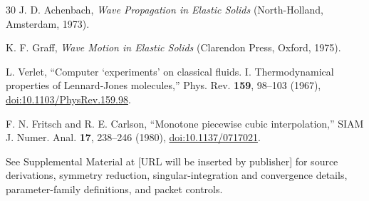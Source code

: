 \documentclass[10pt,aps,pre,reprint,floatfix,notitlepage,nofootinbib]{revtex4-2}
\begin{document}
\begin{thebibliography}{30}
J. D. Achenbach,
\textit{Wave Propagation in Elastic Solids}
(North-Holland, Amsterdam, 1973).

K. F. Graff,
\textit{Wave Motion in Elastic Solids}
(Clarendon Press, Oxford, 1975).

L. Verlet,
``Computer `experiments' on classical fluids. I. Thermodynamical properties of Lennard-Jones molecules,''
Phys. Rev. \textbf{159}, 98--103 (1967),
\href{https://doi.org/10.1103/PhysRev.159.98}{doi:10.1103/PhysRev.159.98}.

F. N. Fritsch and R. E. Carlson,
``Monotone piecewise cubic interpolation,''
SIAM J. Numer. Anal. \textbf{17}, 238--246 (1980),
\href{https://doi.org/10.1137/0717021}{doi:10.1137/0717021}.


See Supplemental Material at [URL will be inserted by publisher] for source derivations, symmetry reduction, singular-integration and convergence details, parameter-family definitions, and packet controls.

\end{thebibliography}

\end{document}
